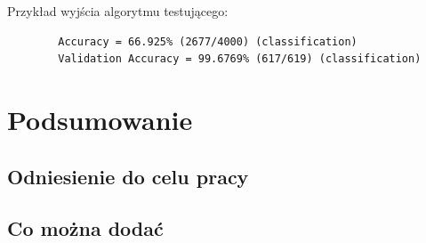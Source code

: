 \documentclass[paper=a4, fontsize=11pt]{scrartcl} %
\numberwithin{equation}{section} %
\numberwithin{figure}{section} %
\begin{document}
    Przykład wyjścia algorytmu testującego:
    \begin{verbatim}
        Accuracy = 66.925% (2677/4000) (classification)
        Validation Accuracy = 99.6769% (617/619) (classification)
    \end{verbatim}

\newpage
\section{Podsumowanie} %
\subsection{Odniesienie do celu pracy}
\subsection{Co można dodać}

\newpage
\nocite{*}
\printbibliography
\end{document}
